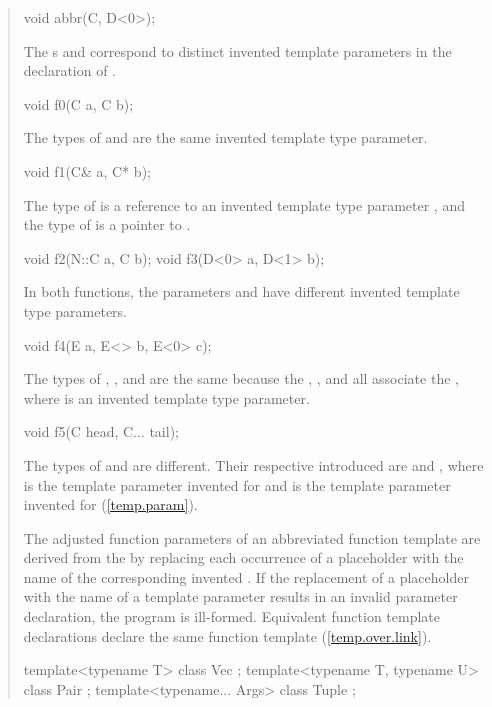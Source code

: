\begin{quote}
\begin{addedblock}
\begin{codeblock}
void abbr(C, D<0>);
\end{codeblock}
The s  and 
correspond to distinct invented template parameters in the declaration
of .
\begin{codeblock}
void f0(C a, C b);
\end{codeblock}
The types of  and  are the same invented template
type parameter.
% 
\begin{codeblock}
void f1(C& a, C* b);
\end{codeblock}
The type of  is a reference to an invented template type parameter 
, and the type of  is a pointer to .
% 
\begin{codeblock}
void f2(N::C a, C b);
void f3(D<0> a, D<1> b);
\end{codeblock}
In both functions, the parameters  and
 have different invented template type parameters.
% 
\begin{codeblock}
void f4(E a, E<> b, E<0> c);
\end{codeblock}
The types of , , and  are the same because the 
 , , and 
 all associate the  
, where  is an invented template type parameter.
% 
\begin{codeblock}
void f5(C head, C... tail);
\end{codeblock}
The types of  and  are different. Their
respective introduced  are  
and , where  is the template parameter invented 
for  and  is the template parameter invented for 
 (\ref{temp.param}).

\pnum 
The adjusted function parameters of an abbreviated function template are derived
from the  by replacing each 
occurrence of a placeholder with the name of the corresponding invented 
.
% 
If the replacement of a placeholder with the name of a template parameter
results in an invalid parameter declaration, the program is ill-formed.
% 
\enternote
Equivalent function template declarations declare the same function template
(\ref{temp.over.link}).
\exitnote
% 
\enterexample
\begin{codeblock}
template<typename T> class Vec { };
template<typename T, typename U> class Pair { };
template<typename... Args> class Tuple { };


\end{codeblock}
\end{addedblock}
\end{quote}

